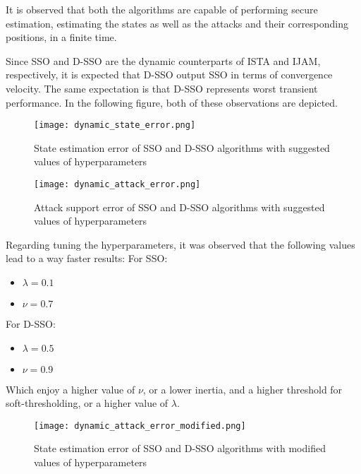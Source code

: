 It is observed that both the algorithms are capable of performing secure estimation, estimating the states as well as the attacks and their corresponding positions, in a finite time. 

Since SSO and D-SSO are the dynamic counterparts of ISTA and IJAM, respectively, it is expected that D-SSO output SSO in terms of convergence velocity. The same expectation is that D-SSO represents worst transient performance. In the following figure, both of these observations are depicted.
 
\begin{figure}[H] %
    \centering
    \texttt{[image: dynamic\_state\_error.png]} %
    \caption{State estimation error of SSO and D-SSO algorithms with suggested values of hyperparameters}
\end{figure}

\begin{figure}[H] %
    \centering
    \texttt{[image: dynamic\_attack\_error.png]} %
    \caption{Attack support error of SSO and D-SSO algorithms with suggested values of hyperparameters}
\end{figure}

Regarding tuning the hyperparameters, it was observed that the following values lead to a way faster results:
For SSO:
\begin{itemize}
	\item $\lambda = 0.1$
	\item $\nu = 0.7$
\end{itemize} 
For D-SSO:
\begin{itemize}
	\item $\lambda = 0.5$
	\item $\nu = 0.9$
\end{itemize} 
Which enjoy a higher value of $\nu$, or a lower inertia, and a higher threshold for soft-thresholding, or a higher value of $\lambda$.

\begin{figure}[H] %
    \centering
    \texttt{[image: dynamic\_attack\_error\_modified.png]} %
    \caption{State estimation error of SSO and D-SSO algorithms with modified values of hyperparameters}
\end{figure}

